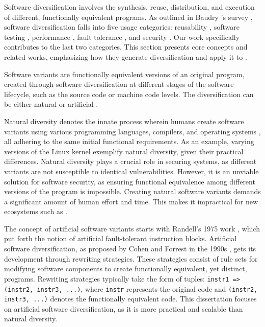 

\label{sota:sw}

Software diversification involves the synthesis, reuse, distribution, and execution of different, functionally equivalent programs. 
As outlined in Baudry \etal's survey \cite{natural_diversity}, software diversification falls into five usage categories: reusability \cite{pohl2005software}, software testing \cite{Chen2010AdaptiveRT}, performance \cite{10.1145/2025113.2025133}, fault tolerance \cite{1659219}, and security \cite{cohen1993operating}. 
Our work specifically contributes to the last two categories.
This section presents core concepts and related works, emphasizing how they generate diversification and apply it to \Wasm.


Software variants are functionally equivalent versions of an original program, created through software diversification at different stages of the software lifecycle, such as the source code or machine code levels. 
The diversification can be either natural \cite{natural_diversity} or artificial \cite{offensive_div}.


Natural diversity denotes the innate process wherein humans create software variants using various programming languages, compilers, and operating systems \cite{natural_diversity}, all adhering to the same initial functional requirements.
As an example, varying versions of the Linux kernel exemplify natural diversity, given their practical differences.
Natural diversity plays a crucial role in securing systems, as different variants are not susceptible to identical vulnerabilities.
However, it is an unviable solution for software security, as ensuring functional equivalence among different versions of the program is impossible. Creating natural software variants demands a significant amount of human effort and time. 
This makes it impractical for new ecosystems such as \Wasm.


 The concept of artificial software variants starts with Randell's 1975 work \cite{10.1145/390016.808467}, which put forth the notion of artificial fault-tolerant instruction blocks. 
Artificial software diversification, as proposed by Cohen and Forrest in the 1990s \cite{cohen1993operating, 595185}, gets its development through rewriting strategies. 
These strategies consist of rule sets for modifying software components to create functionally equivalent, yet distinct, programs. 
Rewriting strategies typically take the form of tuples: \texttt{instr1 => (instr2, instr3, ...)}, where \texttt{instr} represents the original code and \texttt{(instr2, instr3, ...)} denotes the functionally equivalent code.
This dissertation focuses on artificial software diversification, as it is more practical and scalable than natural diversity.

